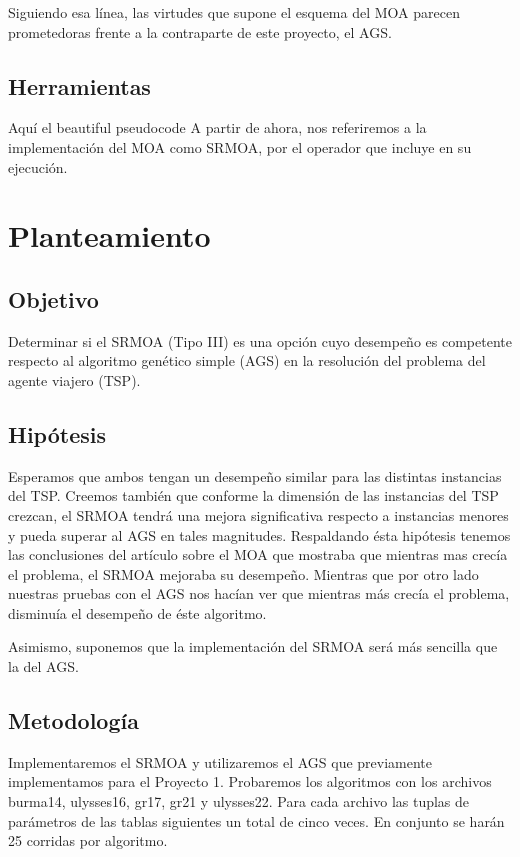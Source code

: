 \documentclass[12pt]{article}
\begin{document}
Siguiendo esa línea, las virtudes que supone el esquema del MOA parecen prometedoras frente a la contraparte de este proyecto, el AGS.


\subsection*{Herramientas}
Aquí el beautiful pseudocode
A partir de ahora, nos referiremos a la implementación del MOA como SRMOA, por el operador que incluye en su ejecución.

\newpage
\section{Planteamiento}
\subsection*{Objetivo}
Determinar si el SRMOA (Tipo III) es una opción cuyo desempeño es competente respecto al algoritmo genético simple (AGS) en la resolución del problema del agente viajero (TSP).
\subsection*{Hipótesis}
 Esperamos que ambos tengan un desempeño similar para las distintas instancias del TSP. Creemos también que conforme la dimensión de las instancias del TSP crezcan, el SRMOA tendrá una mejora significativa respecto a instancias menores y pueda superar al AGS en tales magnitudes.  Respaldando ésta hipótesis tenemos las conclusiones del artículo sobre el MOA que mostraba que mientras mas crecía el problema, el SRMOA mejoraba su desempeño. Mientras que por otro lado nuestras pruebas con el AGS nos hacían ver que mientras más crecía el problema, disminuía el desempeño de éste algoritmo.

Asimismo, suponemos que la implementación del SRMOA será más sencilla que la del AGS.
\subsection*{Metodología}
Implementaremos el SRMOA y utilizaremos el AGS que previamente implementamos para el Proyecto 1. Probaremos los algoritmos con los archivos burma14, ulysses16, gr17, gr21 y ulysses22. Para cada archivo las tuplas de parámetros de las tablas siguientes un total de cinco veces. En conjunto se harán 25 corridas por algoritmo.\\
\end{document}
